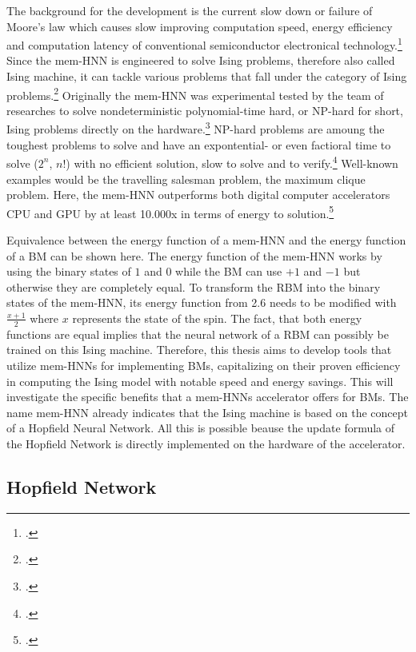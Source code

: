 The background for the development is the current slow down or failure of Moore's law which causes slow improving computation speed, energy efficiency and computation latency of conventional semiconductor electronical technology.\footcite[cf.][1]{caiHarnessingIntrinsicNoise2019}
Since the \ac{mem-HNN} is engineered to solve Ising problems, therefore also called Ising machine, it can tackle various problems that fall under the category of Ising problems.\footcite[cf.][363]{mohseniIsingMachinesHardware2022a}
Originally the \ac{mem-HNN} was experimental tested by the team of researches to solve nondeterministic polynomial-time hard, or NP-hard for short, Ising problems directly on the hardware.\footcite[cf.][410]{caiPowerefficientCombinatorialOptimization2020}
NP-hard problems are amoung the toughest problems to solve and have an expontential- or even factioral time to solve (\( 2^{n} \), \( n{!} \)) with no efficient solution, slow to solve and to verify.\footcite[cf.][497-500]{izadkhahNPNPCompleteNPHard2022}
Well-known examples would be the travelling salesman problem, the maximum clique problem. 
Here, the \ac{mem-HNN} outperforms both digital computer accelerators \ac{CPU} and \ac{GPU} by at least 10.000x in terms of energy to solution.\footcite[cf.][470]{caiPowerefficientCombinatorialOptimization2020}

Equivalence between the energy function of a \ac{mem-HNN} and the energy function of a \ac{BM} can be shown here.
The energy function of the \ac{mem-HNN} works by using the binary states of \( 1 \) and \( 0 \) while the \ac{BM} can use \( +1 \) and \( -1 \) but otherwise they are completely equal.
To transform the \ac{RBM} into the binary states of the \ac{mem-HNN}, its energy function from 2.6 needs to be modified with \(\frac{x + 1}{2}\) where \( x \) represents the state of the spin.
The fact, that both energy functions are equal implies that the neural network of a \ac{RBM} can possibly be trained on this Ising machine.
Therefore, this thesis aims to develop tools that utilize \ac{mem-HNN}s for implementing \ac{BM}s, capitalizing on their proven efficiency in computing the Ising model with notable speed and energy savings.
This will investigate the specific benefits that a \ac{mem-HNN}s accelerator offers for \ac{BM}s.
The name \ac{mem-HNN} already indicates that the Ising machine is based on the concept of a Hopfield Neural Network.
All this is possible beause the update formula of the Hopfield Network is directly implemented on the hardware of the accelerator.

\subsection{Hopfield Network}

